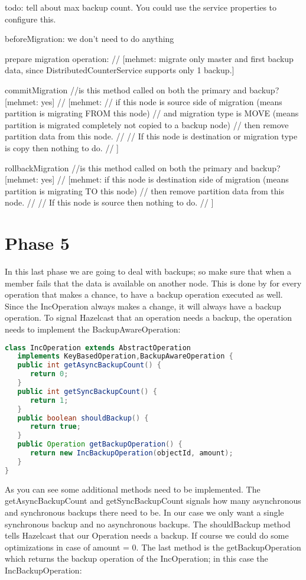 todo: tell about max backup count. You could use the service properties to configure this.

beforeMigration:
we don't need to do anything

prepare migration operation:
// [mehmet: migrate only master and first backup data, since DistributedCounterService supports only 1 backup.]

commitMigration
//is this method called on both the primary and backup? [mehmet: yes]
    // [mehmet:
    // if this node is source side of migration (means partition is migrating FROM this node) 
    // and migration type is MOVE (means partition is migrated completely not copied to a backup node)
    // then remove partition data from this node.
    //
    // If this node is destination or migration type is copy then nothing to do.
    // ]

rollbackMigration
//is this method called on both the primary and backup? [mehmet: yes]
  // [mehmet: if this node is destination side of migration (means partition is migrating TO this node) 
    // then remove partition data from this node.
    // 
    // If this node is source then nothing to do.
    // ]


\section{Phase 5}
In this last phase we are going to deal with backups; so make sure that when a member fails that the data is available on another node. This is done by for every operation that makes a chance, to have a backup operation executed as well. Since the IncOperation always makes a change, it will always have a backup operation. To signal Hazelcast that an operation needs a backup, the operation needs to implement the BackupAwareOperation:
\begin{lstlisting}[language=java]
class IncOperation extends AbstractOperation 
   implements KeyBasedOperation,BackupAwareOperation {
   public int getAsyncBackupCount() {
      return 0;
   }
   public int getSyncBackupCount() {
      return 1;
   }
   public boolean shouldBackup() {
      return true;
   }
   public Operation getBackupOperation() {
      return new IncBackupOperation(objectId, amount);
   }
}
\end{lstlisting}
As you can see some additional methods need to be implemented. The getAsyncBackupCount and getSyncBackupCount signals how many asynchronous and synchronous backups there need to be. In our case we only want a single synchronous backup and no asynchronous backups. The shouldBackup method tells Hazelcast that our Operation needs a backup. If course we could do some optimizations in case of amount = 0. The last method is the getBackupOperation which returns the backup operation of the IncOperation; in this case the IncBackupOperation:


